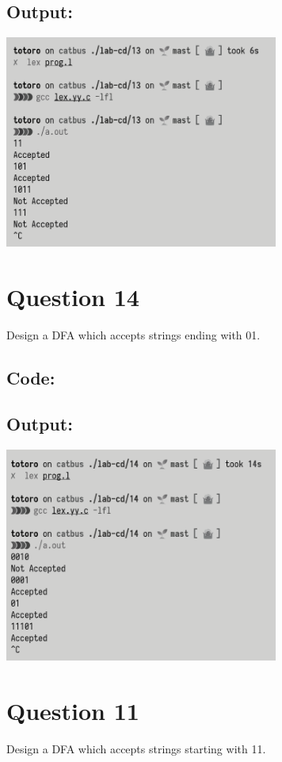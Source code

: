 \documentclass{article}
\begin{document}
\subsection*{Output:}
\begin{center}
  \includegraphics[width=9cm]{13/out.png}
\end{center}

\newpage
\section*{Question 14}
Design a DFA which accepts strings ending with 01.
\subsection*{Code:}

\newpage
\subsection*{Output:}
\begin{center}
  \includegraphics[width=9cm]{14/out.png}
\end{center}

\newpage
\section*{Question 11}
Design a DFA which accepts strings starting with 11.
\end{document}
